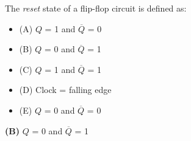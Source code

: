 

The {\it reset} state of a flip-flop circuit is defined as:

\begin{itemize}
\item{(A)} $Q$ = 1 and $\overline{Q}$ = 0
\vskip 5pt 
\item{(B)} $Q$ = 0 and $\overline{Q}$ = 1
\vskip 5pt 
\item{(C)} $Q$ = 1 and $\overline{Q}$ = 1
\vskip 5pt 
\item{(D)} Clock = falling edge
\vskip 5pt 
\item{(E)} $Q$ = 0 and $\overline{Q}$ = 0
\end{itemize}







{\bf (B)} $Q$ = 0 and $\overline{Q}$ = 1
 










